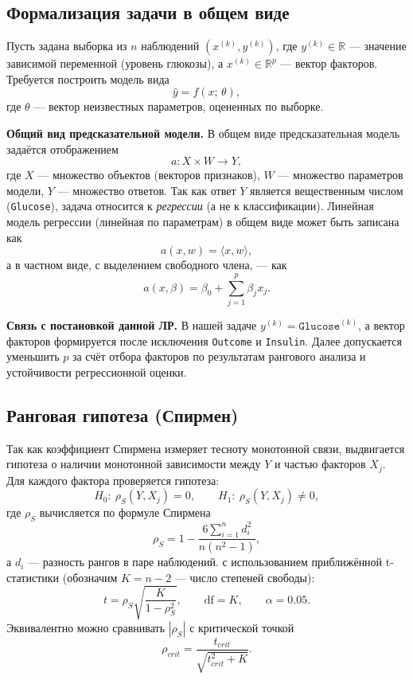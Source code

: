 \documentclass[a4paper, 14pt]{extarticle}
\begin{document}
\subsection{Формализация задачи в общем виде}
Пусть задана выборка из $n$ наблюдений $(x^{(k)},y^{(k)})$, где $y^{(k)}\in\mathbb{R}$ --- значение зависимой
переменной (уровень глюкозы), а $x^{(k)}\in\mathbb{R}^{p}$ --- вектор факторов. Требуется построить модель вида
\[
\hat{y} = f(x;\,\theta),
\]
где $\theta$ --- вектор неизвестных параметров, оцененных по выборке.

\medskip
\textbf{Общий вид предсказательной модели.} В общем виде предсказательная модель задаётся отображением
\[
a: X\times W \to Y,
\]
где $X$ --- множество объектов (векторов признаков), $W$ --- множество параметров модели, $Y$ --- множество ответов.
Так как ответ $Y$ является вещественным числом (\texttt{Glucose}), задача относится к \textit{регрессии} (а не к классификации).
Линейная модель регрессии (линейная по параметрам) в общем виде может быть записана как
\[
a(x,w)=\langle x,w\rangle,
\]
а в частном виде, с выделением свободного члена, --- как
\[
a(x,\beta)=\beta_0+\sum_{j=1}^{p}\beta_j x_j.
\]

\medskip
\textbf{Связь с постановкой данной ЛР.} В нашей задаче $y^{(k)}=\texttt{Glucose}^{(k)}$, а вектор факторов формируется после исключения \texttt{Outcome} и \texttt{Insulin}. Далее допускается уменьшить $p$ за счёт отбора факторов по результатам рангового анализа и устойчивости регрессионной оценки.

\subsection{Ранговая гипотеза (Спирмен)}
Так как коэффициент Спирмена измеряет тесноту монотонной связи, выдвигается гипотеза о наличии
монотонной зависимости между $Y$ и частью факторов $X_j$. Для каждого фактора проверяется гипотеза:
\[
H_0:\ \rho_S(Y,X_j)=0,\qquad H_1:\ \rho_S(Y,X_j)\neq 0,
\]
где $\rho_S$ вычисляется по формуле Спирмена
\[
\rho_S = 1 - \frac{6\sum_{i=1}^{n} d_i^2}{n(n^2-1)},
\]
а $d_i$ --- разность рангов в паре наблюдений.
с использованием приближённой t-статистики (обозначим $K=n-2$ --- число степеней свободы):
\[
t = \rho_S \sqrt{\frac{K}{1-\rho_S^2}},\qquad \text{df}=K,\qquad \alpha=0.05.
\]
Эквивалентно можно сравнивать $|\rho_S|$ с критической точкой
\[
\rho_{crit} = \frac{t_{crit}}{\sqrt{t_{crit}^2 + K}}.
\]
\end{document}
